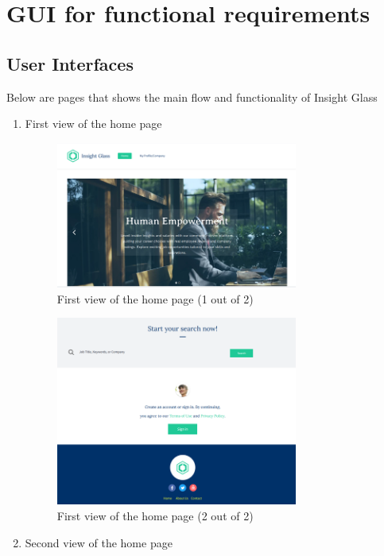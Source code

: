 \documentclass[titlepage]{article}
\begin{document}
\newpage
\section{GUI for functional requirements}
\subsection{User Interfaces}
Below are pages that shows the main flow and functionality of Insight Glass
\begin{enumerate}
    \item First view of the home page
    \begin{figure}[H]
        \centering
        \includegraphics[width=0.75\textwidth]{Images/Home_page_first_view.png}
        \caption{First view of the home page (1 out of 2)}
    \end{figure}
    \begin{figure}[H]
        \centering
        \includegraphics[width=0.75\textwidth]{Images/Home_page_first_view_2.png}
        \caption{First view of the home page (2 out of 2)}
    \end{figure}
    \newpage
    \item Second view of the home page

\end{enumerate}
\end{document}
